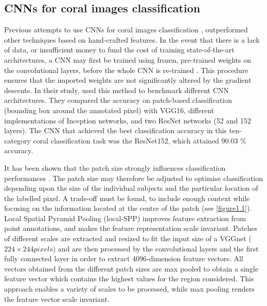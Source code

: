 \subsection{CNNs for coral images classification}\label{chapitre1_2.2}
Previous attempts to use CNNs for coral images classification \citep{beijbom_improving_2016, king_comparison_2018, mahmood_deep_2017, mahmood_coral_2016}, outperformed other techniques based on hand-crafted features. In the event that there is a lack of data, or insufficient money to fund the cost of training state-of-the-art architectures, a CNN may first be trained using frozen, pre-trained weights on the convolutional layers, before the whole CNN is re-trained \citep{king_comparison_2018}. This procedure ensures that the imported weights are not significantly altered by the gradient descents. In their study, \citet{king_comparison_2018} used this method to benchmark different CNN architectures. They compared the accuracy on patch-based classification (bounding box around the annotated pixel) with VGG16, different implementations of Inception networks, and two ResNet networks (52 and 152 layers). The CNN that achieved the best classification accuracy in this ten-category coral classification task was the ResNet152, which attained 90.03 \% accuracy.

It has been shown that the patch size strongly influences classification performances \citep{beijbom_automated_2012}. The patch size may therefore be adjusted to optimise classification depending upon the size of the individual subjects and the particular location of the labelled pixel. A trade-off must be found, to include enough context while focusing on the information located at the centre of the patch \citep{beijbom_automated_2012} (see \autoref{figure1.1}). Local Spatial Pyramid Pooling (local-SPP) \citep{mahmood_coral_2016} improves feature extraction from point annotations, and makes the feature representation scale invariant. Patches of different scales are extracted and resized to fit the input size of a VGGnet (\(224 \times 244 pixels\)) and are then processed by the convolutional layers and the first fully connected layer in order to extract 4096-dimension feature vectors. All vectors obtained from the different patch sizes are max pooled to obtain a single feature vector which contains the highest values for the region considered. This approach enables a variety of scales to be processed, while max pooling renders the feature vector scale invariant.

